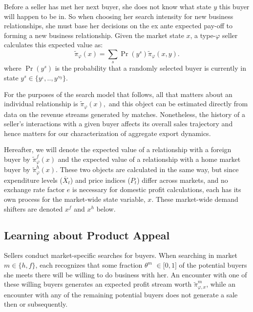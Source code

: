 \documentclass[12pt,titlepage]{article}
\begin{document}
Before a seller has met her next buyer, she does not know what state $y$
this buyer will happen to be in. So when choosing her search intensity for
new business relationships, she must base her decisions on the ex ante
expected pay-off to forming a new business relationship. Given the market
state $x$, a type-$\varphi $ seller calculates this expected value as:%
\begin{equation*}
\widetilde{\pi }_{\varphi }(x)=\sum_{s}\Pr (y^{s})\widetilde{\pi }_{\varphi
}(x,y).
\end{equation*}%
where $\Pr (y^{s})$ is the probability that a randomly selected buyer is
currently in state $y^{s}\in \{y^{_{1}},..,y^{_{Ny}}\}$.\footnotemark{}

For the purposes of the search model that follows, all that matters about an
individual relationship is $\widetilde{\pi }_{\varphi }(x),$ and this object
can be estimated directly from data on the revenue streams generated by
matches. Nonetheless, the history of a seller's interactions with a given
buyer affects its overall sales trajectory and hence matters for our
characterization of aggregate export dynamics.

Hereafter, we will denote the expected value of a relationship with a
foreign buyer by $\widetilde{\pi }_{\varphi }^{f}(x)$ and the expected value
of a relationship with a home market buyer by $\widetilde{\pi }_{\varphi
}^{h}(x).$ These two objects are calculated in the same way, but since
expenditure levels ($\overline{X}_{t}$) and price indices ($P_{t}$) differ
across markets, and no exchange rate factor $e$ is necessary for domestic
profit calculations, each has its own process for the market-wide state
variable, $x.$ These market-wide demand shifters are denoted $x^{f}$ and $%
x^{h}$ below$.$

\subsection{Learning about Product Appeal}

Sellers conduct market-specific searches for buyers. When searching in
market $m\in \{h,f\}$, each recognizes that some fraction $\theta ^{m}$ $\in
\lbrack 0,1]$ of the potential buyers she meets there will be willing to do
business with her. An encounter with one of these willing buyers generates
an expected profit stream worth $\widetilde{\pi }_{\varphi ,x}^{m}$, while
an encounter with any of the remaining potential buyers does not generate a
sale then or subsequently.
\end{document}
